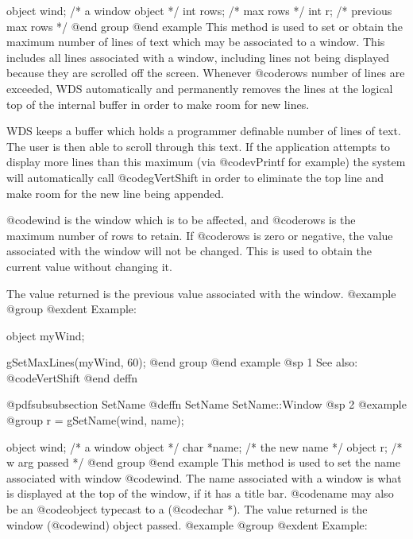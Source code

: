 object  wind;   /*  a window object     */
int     rows;   /*  max rows            */
int     r;      /*  previous max rows   */
@end group
@end example
This method is used to set or obtain the maximum number of lines of text
which may be associated to a window.  This includes all lines associated
with a window, including lines not being displayed because they are
scrolled off the screen.  Whenever @code{rows} number of lines are
exceeded, WDS automatically and permanently removes the lines at the
logical top of the internal buffer in order to make room for new
lines.

WDS keeps a buffer which holds a programmer definable number of lines of
text.  The user is then able to scroll through this text.  If the
application attempts to display more lines than this maximum (via
@code{vPrintf} for example) the system will automatically call
@code{gVertShift} in order to eliminate the top line and make room for
the new line being appended.

@code{wind} is the window which is to be affected, and @code{rows} is the
maximum number of rows to retain.  If @code{rows} is zero or negative,
the value associated with the window will not be changed.  This is used
to obtain the current value without changing it.

The value returned is the previous value associated with the window.
@example
@group
@exdent Example:

object  myWind;

gSetMaxLines(myWind, 60);
@end group
@end example
@sp 1
See also:  @code{VertShift}
@end deffn













@pdfsubsubsection {SetName}
@deffn {SetName} SetName::Window
@sp 2
@example
@group
r = gSetName(wind, name);

object  wind;   /*  a window object     */
char   *name;   /*  the new name        */
object  r;      /*  w arg passed        */
@end group
@end example
This method is used to set the name associated with window @code{wind}.
The name associated with a window is what is displayed at the top of the
window, if it has a title bar.  @code{name} may also be an @code{object}
typecast to a (@code{char *}).  The value returned is the window
(@code{wind}) object passed.
@example
@group
@exdent Example:

